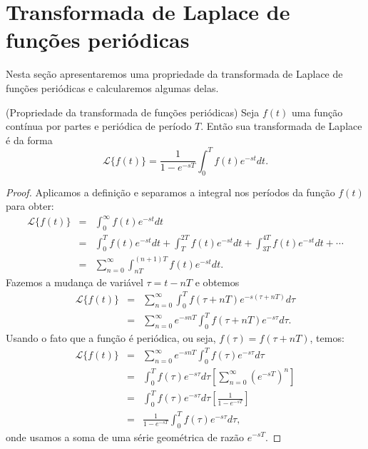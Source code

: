\section{Transformada de Laplace de funções periódicas}
Nesta seção apresentaremos uma propriedade da transformada de Laplace de funções periódicas e calcularemos algumas delas.
\begin{teo}{\label{prop_fun_per}}(Propriedade da transformada de funções periódicas) Seja $f(t)$ uma função contínua por partes e periódica de período $T$. Então sua transformada de Laplace é da forma
\begin{equation}
\mathcal{L}\{f(t)\}=\frac{1}{1-e^{-sT}}\int_0^Tf(t)e^{-st}dt.
\end{equation}
\end{teo}
\begin{proof}Aplicamos a definição e separamos a integral nos períodos da função $f(t)$ para obter:
\begin{eqnarray*}
 \mathcal{L}\{f(t)\}&=&\int_0^\infty f(t)e^{-st}dt \\
 &=&\int_0^T f(t)e^{-st}dt+\int_T^{2T} f(t)e^{-st}dt+\int_{3T}^{4T} f(t)e^{-st}dt+\cdots\\
 &=&\sum_{n=0}^\infty \int_{nT}^{(n+1)T} f(t)e^{-st}dt.
\end{eqnarray*}
Fazemos a mudança de variável $\tau=t-nT$ e obtemos
 \begin{eqnarray*}
 \mathcal{L}\{f(t)\}&=&\sum_{n=0}^\infty \int_{0}^{T} f(\tau+nT)e^{-s(\tau+nT)}d\tau\\
 &=&\sum_{n=0}^\infty e^{-snT} \int_{0}^{T} f(\tau+nT)e^{-s\tau}d\tau.
 \end{eqnarray*}
 Usando o fato que a função é periódica, ou seja, $f(\tau)=f(\tau+nT)$, temos:
 \begin{eqnarray*}
  \mathcal{L}\{f(t)\}&=&\sum_{n=0}^\infty e^{-snT} \int_{0}^{T} f(\tau)e^{-s\tau}d\tau\\
 &=&\int_{0}^{T} f(\tau)e^{-s\tau}d\tau\left[\sum_{n=0}^\infty \left(e^{-sT}\right)^n \right]\\
 &=&\int_{0}^{T} f(\tau)e^{-s\tau}d\tau\left[\frac{1}{1-e^{-sT}} \right]\\
 &=&\frac{1}{1-e^{-sT}}\int_{0}^{T} f(\tau)e^{-s\tau}d\tau,
\end{eqnarray*}
onde usamos a soma de uma série geométrica de razão $e^{-sT}$.
 \end{proof}
